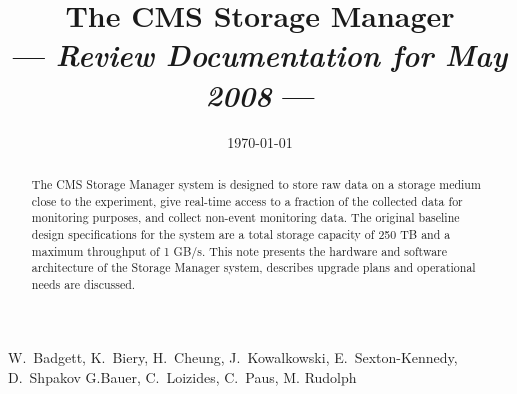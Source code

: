 \documentclass[12pt]{cmspaper}
\begin{document}

\begin{titlepage}

   \date{\today}

  \title{The CMS Storage Manager\\
\Large 
 --- {\it Review Documentation for May 2008} ---}

  \begin{Authlist}
    W.~Badgett, K.~Biery, H.~Cheung, J.~Kowalkowski, 
    E.~Sexton-Kennedy, D.~Shpakov
    G.Bauer, C.~Loizides, C.~Paus, M. Rudolph 
  \end{Authlist}



  \begin{abstract}
The CMS Storage Manager system is designed to store raw data on a storage medium close to the
experiment, give real-time access to a fraction of the collected data for monitoring purposes, and
collect non-event monitoring data. The original baseline design specifications for the system 
are a total storage capacity
of 250 TB and a maximum throughput of 1 GB/s. This note presents the hardware and software
architecture of  the Storage Manager system, describes  upgrade plans and operational 
needs are discussed. 
  \end{abstract} 

  
\end{titlepage}

\setcounter{page}{2}%











\end{document}
